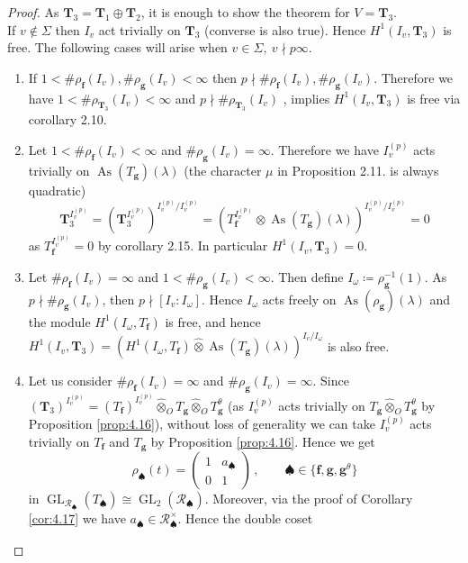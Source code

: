 \documentclass[10pt,a4paper]{amsart}
\newcommand{\As}{\operatorname{As}}
\newcommand{\GL}[1]{\operatorname{GL}_{#1}}
\newcommand{\R}{\mathcal{R}}
\newcommand{\T}{\mathbf{T}}
\newcommand{\f}{\mathbf{f}}
\newcommand{\g}{\mathbf{g}}
\begin{document}
	\begin{proof}
		As  $ \T_3 = \T_1 \oplus \T_2 $, it is enough to show the theorem for $ V = \T_3 $. \\
		If $ v \notin \Sigma $ then $ I_v $ act trivially on $ \T_3 $ (converse is also true). Hence $H^1(I_v , \T_3 )$ is free. The following cases will arise when $ v \in \Sigma, \: v \nmid p\infty $. 
		\begin{enumerate}
			\item If $ 1 < \#\rho_{\f}(I_v),\#\rho_{\g}(I_v) < \infty $ then $ p \nmid \#\rho_{\f}(I_v),\#\rho_{\g}(I_v) $. Therefore we have $ 1< \#\rho_{\T_3}(I_v) < \infty $ and $ p \nmid \#\rho_{\T_3}(I_v) $ , implies $ H^1(I_v , \T_3) $ is free via corollary 2.10.
			\item Let $ 1 < \#\rho_{\f}(I_v) < \infty $ and $ \#\rho_{\g}(I_v) = \infty $. Therefore we have  $ I_v^{(p)} $ acts trivially on $ \As(T_\g)(\lambda) $ (the character $ \mu$ in Proposition 2.11. is always quadratic)
			$$ \T_3^{I_v^{(p)}} = (\T_3^{I_v^{(p)}})^{I_v^{(p)}/I_v^{(p)}} = (T_\f^{I_v^{(p)}} \otimes \As(T_\g)(\lambda))^{I_v^{(p)}/I_v^{(p)}} = 0 $$ 
			as $T_\f^{I_v^{(p)}} = 0$ by corollary 2.15. In particular $ H^1(I_v , \T_3) =0$. 
			\item Let $ \#\rho_{\f}(I_v) = \infty $ and $ 1 < \#\rho_{\g}(I_v) < \infty $. Then define $ I_\omega \coloneqq \rho_{\g}^{-1}(1) $. As $ p \nmid \#\rho_{\g}(I_v) $, then $ p \nmid [I_v \colon I_\omega] $. Hence $ I_\omega $ acts freely on $ \As(\rho_{\g})(\lambda) $ and the module $ H^1(I_\omega, T_\f) $ is free, and hence $ H^1(I_v,  \T_3) =(H^1(I_\omega, T_\f)\widehat{\otimes}\As(T_\g)(\lambda))^{I_v/I_\omega}  $ is also free. 
			\item Let us consider $\#\rho_{\f}(I_v) = \infty$ and $\#\rho_{\g}(I_v) = \infty$. Since $(\T_3)^{I_v^{(p)}} = (T_{\f})^{I_v^{(p)}} \widehat{\otimes}_{O} T_{\g}\widehat{\otimes}_{O} T_{\g}^\theta$ (as $I_v^{(p)}$ acts trivially on $T_{\g} \widehat{\otimes}_{O}T_{\g}^\theta$ by Proposition \ref{prop:4.16}), without loss of generality we can take 
			$I_v^{(p)}$ acts trivially on $T_{\f}$ and $T_{\g}$ by Proposition \ref{prop:4.16}. Hence we get 
			\[
			\rho_{\spadesuit}(t) = 
			\begin{pmatrix}
				1 & a_{\spadesuit}
				\\
				0 & 1
			\end{pmatrix}  \,,\qquad \spadesuit \in \{\f, \g, \g^\theta\}
			\]
			in $\GL{\R_{\spadesuit}}(T_{\spadesuit}) \cong \GL{2}(\R_{\spadesuit})$. 
			Moreover, via the proof of Corollary \ref{cor:4.17} we have $a_{\spadesuit} \in \R_{\spadesuit}^\times$. Hence the double coset 

\end{enumerate}
\end{proof}
\end{document}
